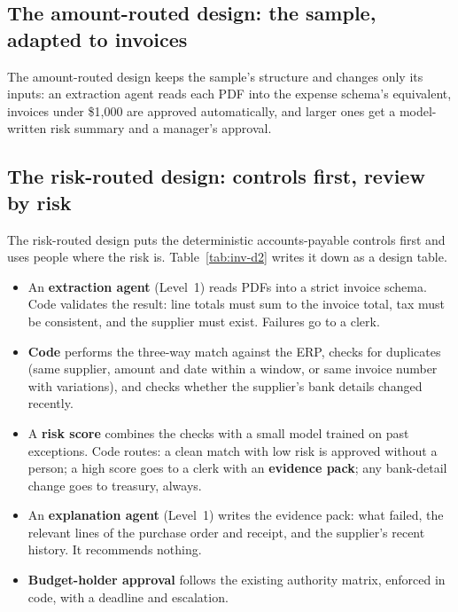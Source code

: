 \subsection{The amount-routed design: the sample, adapted to invoices}

The amount-routed design keeps the sample's structure and changes only its inputs: an extraction agent reads each PDF into the expense schema's equivalent, invoices under \$1{,}000 are approved automatically, and larger ones get a model-written risk summary and a manager's approval.

\subsection{The risk-routed design: controls first, review by risk}

The risk-routed design puts the deterministic accounts-payable controls first and uses people where the risk is. Table~\ref{tab:inv-d2} writes it down as a design table.
\begin{itemize}[itemsep=1pt]
  \item An \textbf{extraction agent} (Level~1) reads PDFs into a strict invoice schema. Code validates the result: line totals must sum to the invoice total, tax must be consistent, and the supplier must exist. Failures go to a clerk.
  \item \textbf{Code} performs the three-way match against the ERP, checks for duplicates (same supplier, amount and date within a window, or same invoice number with variations), and checks whether the supplier's bank details changed recently.
  \item A \textbf{risk score} combines the checks with a small model trained on past exceptions. Code routes: a clean match with low risk is approved without a person; a high score goes to a clerk with an \textbf{evidence pack}; any bank-detail change goes to treasury, always.
  \item An \textbf{explanation agent} (Level~1) writes the evidence pack: what failed, the relevant lines of the purchase order and receipt, and the supplier's recent history. It recommends nothing.
  \item \textbf{Budget-holder approval} follows the existing authority matrix, enforced in code, with a deadline and escalation.
\end{itemize}

